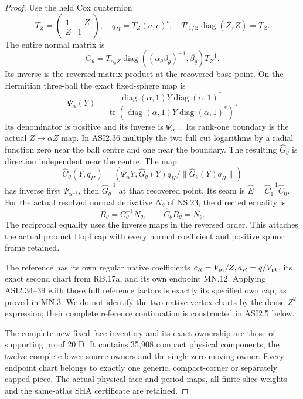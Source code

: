 \begin{proof}
Use the held Cox quaternion
\[
 T_Z=\begin{pmatrix}1&-\bar Z\\Z&1\end{pmatrix},\quad
 q_H=T_Z(a,\bar c)^t,\quad
 T'_{1/Z}\operatorname{diag}(Z,\bar Z)=T_Z.
 \tag{ASI2.35}
\]
The entire normal matrix is
\[
 G_\theta=T_{\alpha_\theta Z}
       \operatorname{diag}((\alpha_\theta\beta_\theta)^{-1},
                              \overline{\beta_\theta})T_Z^{-1}.
 \tag{ASI2.36}
\]
Its inverse is the reversed matrix product at the
recovered base point. On the Hermitian three-ball
the exact fixed-sphere map is
\[
 \Psi_\alpha(Y)=
 \frac{\operatorname{diag}(\alpha,1)Y
                    \operatorname{diag}(\alpha,1)^*}
 {\operatorname{tr}(\operatorname{diag}(\alpha,1)Y
                    \operatorname{diag}(\alpha,1)^*)}.
 \tag{ASI2.37}
\]
Its denominator is positive and its inverse is
\(\Psi_{\alpha^{-1}}\). Its rank-one boundary is
the actual \(Z\mapsto\alpha Z\) map. In ASI2.36
multiply the two full cut logarithms by a radial
function zero near the ball centre and one near
the boundary. The resulting \(\widehat G_\theta\)
is direction independent near the centre. The
map
\[
 \widehat C_\theta(Y,q_H)=
 \left(\Psi_\alpha Y,
       \widehat G_\theta(Y)q_H/
                         \|\widehat G_\theta(Y)q_H\|\right)
 \tag{ASI2.38}
\]
has inverse first \(\Psi_{\alpha^{-1}}\), then
\(\widehat G_\theta^{-1}\) at that recovered
point. Its seam is
\(\widehat E=\widehat C_1^{-1}\widehat C_0\).
For the actual resolved normal derivative \(N_\theta\)
of NS.23, the directed equality is
\[
          B_\theta=C_\theta^{-1}N_\theta,\qquad
                    \widehat C_\theta B_\theta=N_\theta.
 \tag{ASI2.39}
\]
The reciprocal equality uses the inverse maps in
the reversed order. This attaches the actual
product Hopf cap with every normal coefficient
and positive spinor frame retained.

The reference has its own regular native
coefficients \(c_R=V_{\rm pt}/Z,a_R=q/V_{\rm pt}\),
its exact second chart from RB.17a, and its own
endpoint MN.12. Applying ASI2.34--39 with those
full reference factors is exactly its specified
own cap, as proved in MN.3. We do not identify
the two native vertex charts by the dense
\(Z^2\) expression; their complete reference
continuation is constructed in ASI2.5 below.

The complete new fixed-face inventory and its exact ownership are
those of supporting proof 20 D.  It contains 35,908 compact physical
components, the twelve complete lower source owners and the single
zero moving owner.  Every endpoint chart belongs to exactly one
generic, compact-corner or separately capped piece.  The actual
physical face and period maps, all finite slice weights and the
same-atlas SHA certificate are retained.


\end{proof}

